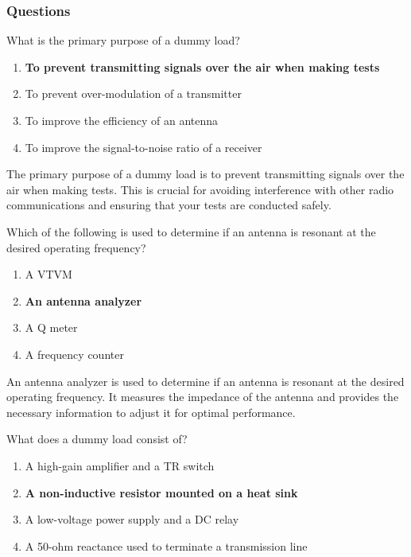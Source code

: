\subsubsection*{Questions}

\begin{tcolorbox}[colback=gray!10!white,colframe=black!75!black,title={T7C01}]
    What is the primary purpose of a dummy load?
    \begin{enumerate}[label=\Alph*),noitemsep]
        \item \textbf{To prevent transmitting signals over the air when making tests}
        \item To prevent over-modulation of a transmitter
        \item To improve the efficiency of an antenna
        \item To improve the signal-to-noise ratio of a receiver
    \end{enumerate}
\end{tcolorbox}

The primary purpose of a dummy load is to prevent transmitting signals over the air when making tests. This is crucial for avoiding interference with other radio communications and ensuring that your tests are conducted safely.

\begin{tcolorbox}[colback=gray!10!white,colframe=black!75!black,title={T7C02}]
    Which of the following is used to determine if an antenna is resonant at the desired operating frequency?
    \begin{enumerate}[label=\Alph*),noitemsep]
        \item A VTVM
        \item \textbf{An antenna analyzer}
        \item A Q meter
        \item A frequency counter
    \end{enumerate}
\end{tcolorbox}

An antenna analyzer is used to determine if an antenna is resonant at the desired operating frequency. It measures the impedance of the antenna and provides the necessary information to adjust it for optimal performance.

\begin{tcolorbox}[colback=gray!10!white,colframe=black!75!black,title={T7C03}]
    What does a dummy load consist of?
    \begin{enumerate}[label=\Alph*),noitemsep]
        \item A high-gain amplifier and a TR switch
        \item \textbf{A non-inductive resistor mounted on a heat sink}
        \item A low-voltage power supply and a DC relay
        \item A 50-ohm reactance used to terminate a transmission line
    \end{enumerate}
\end{tcolorbox}

